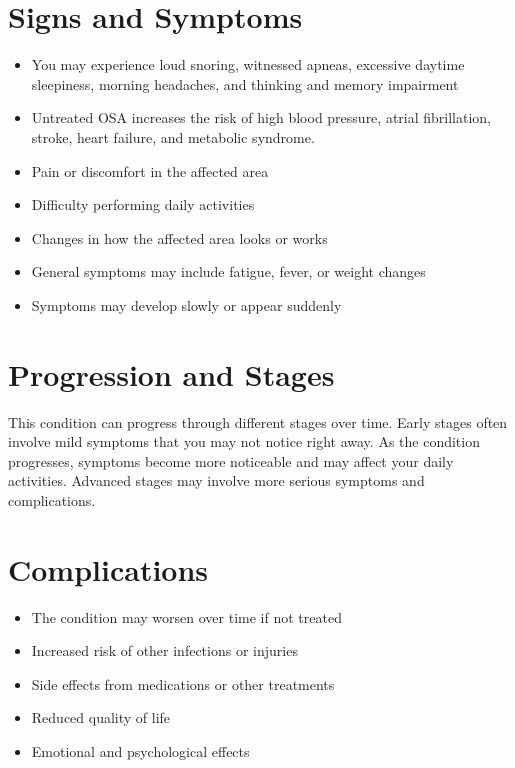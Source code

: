 \section{Signs and Symptoms}

\begin{itemize}[noitemsep]
  \item You may experience loud snoring, witnessed apneas, excessive daytime sleepiness, morning headaches, and thinking and memory impairment
  \item Untreated OSA increases the risk of high blood pressure, atrial fibrillation, stroke, heart failure, and metabolic syndrome.
  \item Pain or discomfort in the affected area
  \item Difficulty performing daily activities
  \item Changes in how the affected area looks or works
  \item General symptoms may include fatigue, fever, or weight changes
  \item Symptoms may develop slowly or appear suddenly
\end{itemize}

\section{Progression and Stages}
This condition can progress through different stages over time. Early stages often involve mild symptoms that you may not notice right away. As the condition progresses, symptoms become more noticeable and may affect your daily activities. Advanced stages may involve more serious symptoms and complications.

\section{Complications}

\begin{itemize}[noitemsep]
  \item The condition may worsen over time if not treated
  \item Increased risk of other infections or injuries
  \item Side effects from medications or other treatments
  \item Reduced quality of life
  \item Emotional and psychological effects
\end{itemize}

